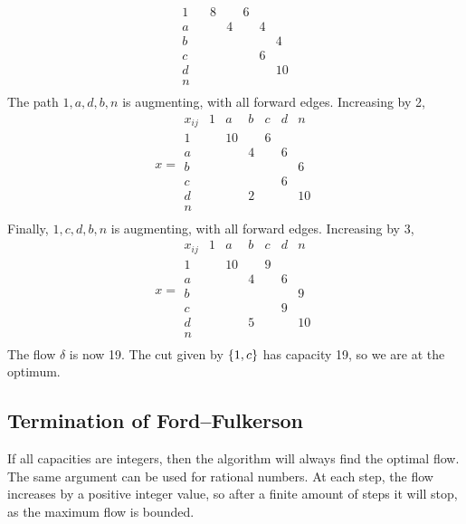 \begin{example}
\[\begin{array}{c|cccccc}
			1      &   & 8 &   & 6 &   &    \\
			a      &   &   & 4 &   & 4 &    \\
			b      &   &   &   &   &   & 4  \\
			c      &   &   &   &   & 6 &    \\
			d      &   &   &   &   &   & 10 \\
			n                               \\
		\end{array}
	\]
	The path \( 1,a,d,b,n \) is augmenting, with all forward edges.
	Increasing by 2,
	\[
		x = \begin{array}{c|cccccc}
			x_{ij} & 1 & a  & b & c & d & n  \\\hline
			1      &   & 10 &   & 6 &   &    \\
			a      &   &    & 4 &   & 6 &    \\
			b      &   &    &   &   &   & 6  \\
			c      &   &    &   &   & 6 &    \\
			d      &   &    & 2 &   &   & 10 \\
			n                                \\
		\end{array}
	\]
	Finally, \( 1,c,d,b,n \) is augmenting, with all forward edges.
	Increasing by 3,
	\[
		x = \begin{array}{c|cccccc}
			x_{ij} & 1 & a  & b & c & d & n  \\\hline
			1      &   & 10 &   & 9 &   &    \\
			a      &   &    & 4 &   & 6 &    \\
			b      &   &    &   &   &   & 9  \\
			c      &   &    &   &   & 9 &    \\
			d      &   &    & 5 &   &   & 10 \\
			n                                \\
		\end{array}
	\]
	The flow \( \delta \) is now 19.
	The cut given by \( \qty{1,c} \) has capacity 19, so we are at the optimum.
\end{example}

\subsection{Termination of Ford--Fulkerson}
If all capacities are integers, then the algorithm will always find the optimal flow.
The same argument can be used for rational numbers.
At each step, the flow increases by a positive integer value, so after a finite amount of steps it will stop, as the maximum flow is bounded.

